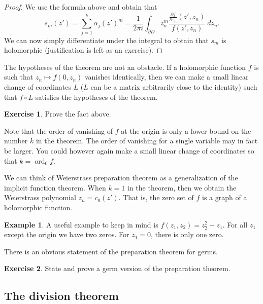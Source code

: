 \documentclass[12pt,openany]{book}
\newcommand{\ord}{\operatorname{ord}}
\theoremstyle{plain}
\theoremstyle{remark}
\theoremstyle{definition}
\theoremstyle{exercise}
\newtheorem{exercise}{Exercise}[section]
\theoremstyle{example}
\newtheorem{example}[thm]{Example}
\begin{document}
\begin{proof}
We use the formula above and obtain that
\begin{equation}
s_m(z') = 
\sum_{j=1}^k {\alpha_j(z')}^m
=
\frac{1}{2\pi i}
\int_{\partial D}
z_n^m
\frac{\frac{\partial f}{\partial z_n} (z',z_n)}{f(z',z_n)} ~dz_n .
\end{equation}
We can now simply differentiate under the integral to obtain that $s_m$
is holomorphic (justification is left as an exercise).
\end{proof}

The hypotheses of the theorem are not an obstacle.  If a holomorphic
function $f$ is such that $z_n \mapsto f(0,z_n)$ vanishes identically,
then we can make a small linear change of
coordinates $L$ ($L$ can be a matrix arbitrarily close to the identity) such
that $f \circ L$ satisfies the hypotheses of the theorem.

\begin{exercise}
Prove the fact above.
\end{exercise}

Note that the order of vanishing of $f$ at the origin is only a lower bound
on the number $k$ in the theorem.  The order of vanishing for a single
variable may in fact be larger.  You could however again make a small linear
change of coordinates so that $k = \ord_0 f$.

We can think of Weierstrass preparation theorem as a generalization of
the implicit function theorem.  When $k=1$ in the theorem, then we obtain
the Weierstrass polynomial $z_n = c_0(z')$.  That is, the zero set of 
$f$ is a graph of a holomorphic function.

\begin{example}
A useful example to keep in mind is $f(z_1,z_2) = z_2^2 - z_1$.  For
all $z_1$ except the origin we have two zeros.  For $z_1 = 0$, there
is only one zero.
\end{example}

There is an obvious statement of the preparation theorem for germs.

\begin{exercise}
State and prove a germ version of the preparation theorem.
\end{exercise}

\subsection{The division theorem}

\end{document}

